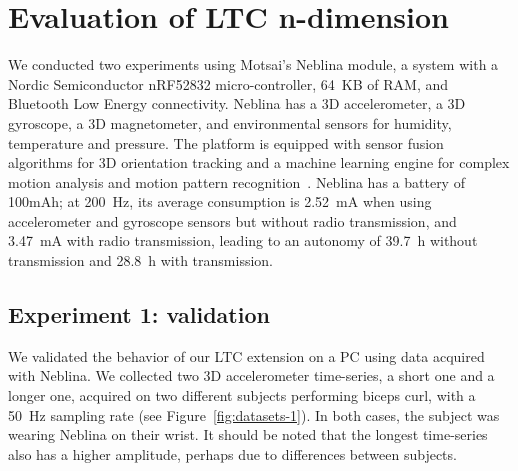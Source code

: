 \section{Evaluation of LTC n-dimension}
\label{sec:ltc-n-dimensions}


We conducted two experiments using Motsai's Neblina
module, a system
with a Nordic Semiconductor nRF52832 micro-controller, 64~KB of RAM,
and Bluetooth Low Energy connectivity. Neblina has a 3D
accelerometer, a 3D gyroscope, a 3D magnetometer, and environmental
sensors for humidity, temperature and pressure. The platform is
equipped with sensor fusion algorithms for 3D orientation tracking and
a machine learning engine for complex motion analysis and motion
pattern recognition~\cite{sarbishei2016accuracy}. Neblina has a
battery of 100mAh; at 200~Hz, its average consumption is 2.52~mA when using
accelerometer and gyroscope sensors but without radio
transmission, and 3.47~mA with radio transmission, leading to an
autonomy of 39.7~h without transmission and 28.8~h with transmission.

\subsection{Experiment 1: validation}
We validated the behavior of our LTC extension on a PC using data
acquired with Neblina. We collected two 3D accelerometer time-series, a
short one and a longer one, acquired on two different subjects
performing biceps curl, with a 50~Hz sampling rate (see
Figure~\ref{fig:datasets-1}). In both cases, the subject was wearing
Neblina on their wrist. It should be noted that the longest
time-series also has a higher amplitude, perhaps due to differences between
subjects.


